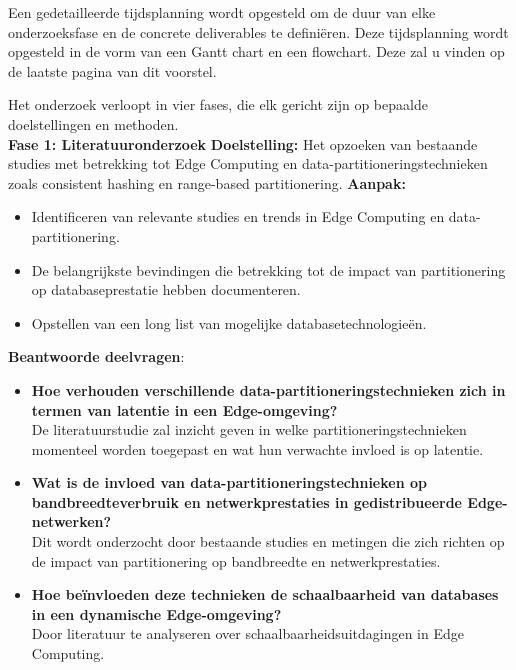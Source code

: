 Een gedetailleerde tijdsplanning wordt opgesteld om de duur van elke onderzoeksfase en de concrete deliverables te definiëren.
Deze tijdsplanning wordt opgesteld in de vorm van een Gantt chart en een flowchart. Deze zal u vinden op de laatste pagina van dit voorstel.

Het onderzoek verloopt in vier fases, die elk gericht zijn op bepaalde doelstellingen en methoden. \\

\textbf{Fase 1: Literatuuronderzoek}\newline\newline
    \textbf{Doelstelling:} Het opzoeken van bestaande studies met betrekking tot Edge Computing en data-partitioneringstechnieken zoals consistent hashing en range-based partitionering.\newline\newline
    \textbf{Aanpak:}
    \begin{itemize}
      \item Identificeren van relevante studies en trends in Edge Computing en data-partitionering.
      \item De belangrijkste bevindingen die betrekking tot de impact van partitionering op databaseprestatie hebben documenteren.
      \item Opstellen van een long list van mogelijke databasetechnologieën.
    \end{itemize}
    \textbf{Beantwoorde deelvragen}:
    \begin{itemize}
    \item \textbf{Hoe verhouden verschillende data-partitioneringstechnieken zich in termen van latentie in een Edge-omgeving?} \\
      De literatuurstudie zal inzicht geven in welke partitioneringstechnieken momenteel worden toegepast en wat hun verwachte invloed is op latentie.
    \item \textbf{Wat is de invloed van data-partitioneringstechnieken op bandbreedteverbruik en netwerkprestaties in gedistribueerde Edge-netwerken?} \\
      Dit wordt onderzocht door bestaande studies en metingen die zich richten op de impact van partitionering op bandbreedte en netwerkprestaties.
    \item \textbf{Hoe beïnvloeden deze technieken de schaalbaarheid van databases in een dynamische Edge-omgeving?} \\
      Door literatuur te analyseren over schaalbaarheidsuitdagingen in Edge Computing.
    \end{itemize}
